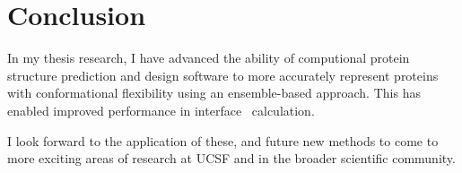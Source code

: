 \chapter{Conclusion}

In my thesis research, I have advanced the ability of computional protein structure prediction and design software to more accurately represent proteins with conformational flexibility using an ensemble-based approach.
This has enabled improved performance in interface \ddg\ calculation.

I look forward to the application of these, and future new methods to come to more exciting areas of research at UCSF and in the broader scientific community.